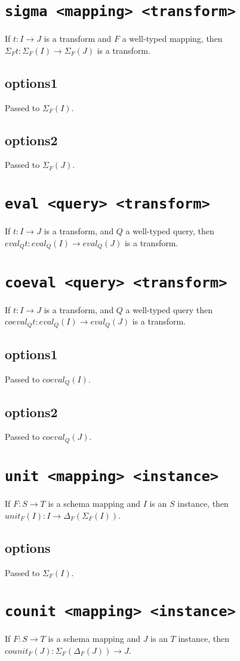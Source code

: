 \documentclass[10pt]{book}
\begin{document}
\section{{\tt sigma <mapping> <transform>}}
If $t : I \to J$ is a transform and $F$ a well-typed mapping, then $\Sigma_Ft : \Sigma_F(I) \to \Sigma_F(J)$ is a transform.
\subsection{options1}
Passed to $\Sigma_F(I)$.
\subsection{options2}
Passed to $\Sigma_F(J)$.

\section{{\tt eval <query> <transform>}}
If $t : I \to J$ is a transform, and $Q$ a well-typed query, then $eval_Qt : eval_Q(I) \to eval_Q(J)$ is a transform.

\section{{\tt coeval <query> <transform>}}
If $t : I \to J$ is a transform, and $Q$ a well-typed query then $coeval_Qt : eval_Q(I) \to eval_Q(J)$ is a transform.
\subsection{options1}
Passed to $coeval_Q(I)$.
\subsection{options2}
Passed to $coeval_Q(J)$.

\section{{\tt unit <mapping> <instance>}}
If $F : S \to T$ is a schema mapping and $I$ is an $S$ instance, then $unit_F(I) : I \to \Delta_F(\Sigma_F(I))$.
\subsection{options}
Passed to $\Sigma_F(I)$.

\section{{\tt counit <mapping> <instance>}}
If $F : S \to T$ is a schema mapping and $J$ is an $T$ instance, then $counit_F(J) : \Sigma_F(\Delta_F(J))  \to J$.
\end{document}
